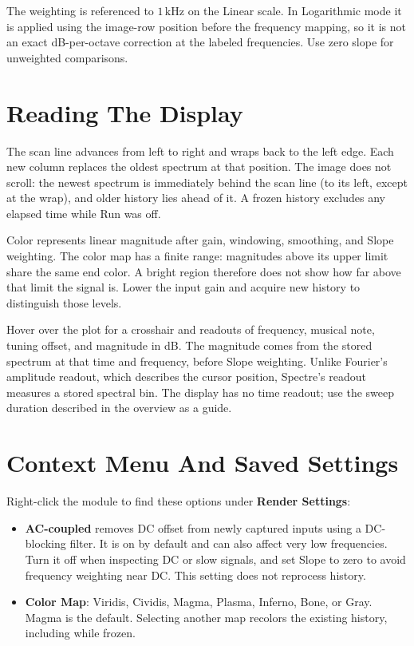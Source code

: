 \documentclass[12pt,letterpaper]{article}
\begin{document}
The weighting is referenced to $1\,\mathrm{kHz}$ on the Linear scale. In
Logarithmic mode it is applied using the image-row position before the
frequency mapping, so it is not an exact dB-per-octave correction at the
labeled frequencies. Use zero slope for unweighted comparisons.


\clearpage
\section{Reading The Display}

The scan line advances from left to right and wraps back to the left edge.
Each new column replaces the oldest spectrum at that position. The image
does not scroll: the newest spectrum is immediately behind the scan line
(to its left, except at the wrap), and older history lies ahead of it.
A frozen history excludes any elapsed time while Run was off.

Color represents linear magnitude after gain, windowing, smoothing, and
Slope weighting. The color map has a finite range: magnitudes above its
upper limit share the same end color. A bright region therefore does not
show how far above that limit the signal is. Lower the input gain and
acquire new history to distinguish those levels.

Hover over the plot for a crosshair and readouts of frequency, musical note,
tuning offset, and magnitude in dB. The magnitude comes from the stored
spectrum at that time and frequency, before Slope weighting. Unlike Fourier's
amplitude readout, which describes the cursor position, Spectre's readout
measures a stored spectral bin. The display has no time readout; use the sweep
duration described in the overview as a guide.

\section{Context Menu And Saved Settings}

Right-click the module to find these options under \textbf{Render Settings}:
\begin{itemize}
  \item \textbf{AC-coupled} removes DC offset from newly captured inputs
  using a DC-blocking filter. It is on by default and can also affect very
  low frequencies. Turn it off when inspecting DC or slow signals, and set
  Slope to zero to avoid frequency weighting near DC. This setting does not
  reprocess history.
  \item \textbf{Color Map}: Viridis, Cividis, Magma, Plasma, Inferno, Bone,
  or Gray. Magma is the default. Selecting another map recolors the existing
  history, including while frozen.
\end{itemize}
\end{document}
